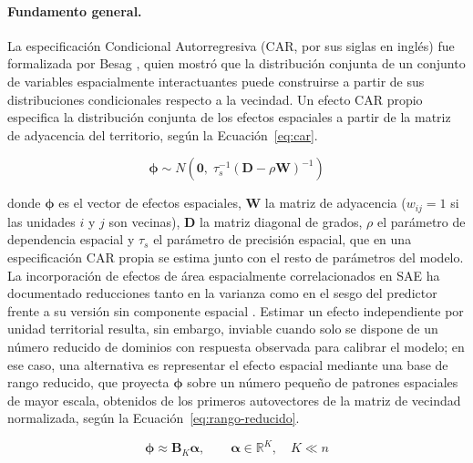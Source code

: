 \paragraph{Fundamento general.}
La especificación Condicional Autorregresiva (CAR, por sus siglas en inglés) fue formalizada por Besag \cite{Besag_1974}, quien mostró que la distribución conjunta de un conjunto de variables espacialmente interactuantes puede construirse a partir de sus distribuciones condicionales respecto a la vecindad. Un efecto CAR propio especifica la distribución conjunta de los efectos espaciales a partir de la matriz de adyacencia del territorio, según la Ecuación~\ref{eq:car}.

\begin{equation}
    \boldsymbol{\phi} \sim N\!\left(\mathbf{0},\; \tau_s^{-1}(\mathbf{D} - \rho \mathbf{W})^{-1}\right)
    \label{eq:car}
\end{equation}

\noindent donde $\boldsymbol{\phi}$ es el vector de efectos espaciales, $\mathbf{W}$ la matriz de adyacencia ($w_{ij}=1$ si las unidades $i$ y $j$ son vecinas), $\mathbf{D}$ la matriz diagonal de grados, $\rho$ el parámetro de dependencia espacial y $\tau_s$ el parámetro de precisión espacial, que en una especificación CAR propia se estima junto con el resto de parámetros del modelo. La incorporación de efectos de área espacialmente correlacionados en SAE ha documentado reducciones tanto en la varianza como en el sesgo del predictor frente a su versión sin componente espacial \cite{PratesiSalvati_2008, PratesiSalvati_2019}. Estimar un efecto independiente por unidad territorial resulta, sin embargo, inviable cuando solo se dispone de un número reducido de dominios con respuesta observada para calibrar el modelo; en ese caso, una alternativa es representar el efecto espacial mediante una base de rango reducido, que proyecta $\boldsymbol{\phi}$ sobre un número pequeño de patrones espaciales de mayor escala, obtenidos de los primeros autovectores de la matriz de vecindad normalizada, según la Ecuación~\ref{eq:rango-reducido}.

\begin{equation}
    \boldsymbol{\phi} \approx \mathbf{B}_K \boldsymbol{\alpha}, \qquad \boldsymbol{\alpha} \in \mathbb{R}^{K}, \quad K \ll n
    \label{eq:rango-reducido}
\end{equation}

